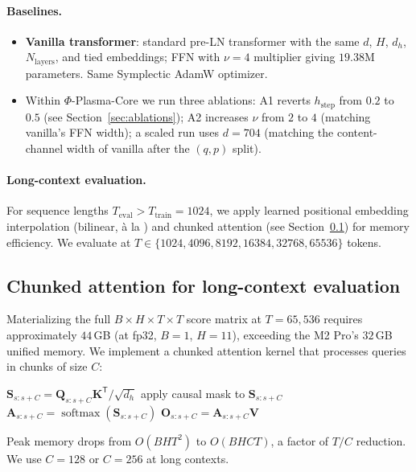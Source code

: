 \documentclass[11pt]{article}
\newcommand{\T}{\mathsf{T}}
\DeclareMathOperator{\softmax}{softmax}
\begin{document}
\paragraph{Baselines.}
\begin{itemize}[leftmargin=*]
\item \textbf{Vanilla transformer}: standard pre-LN transformer with the same
$d$, $H$, $d_h$, $N_{\text{layers}}$, and tied embeddings; FFN with $\nu = 4$
multiplier giving $19.38$M parameters. Same Symplectic AdamW optimizer.
\item Within $\Phi$-Plasma-Core we run three ablations: A1 reverts $h_{\text{step}}$
from $0.2$ to $0.5$ (see Section~\ref{sec:ablations}); A2 increases $\nu$ from
$2$ to $4$ (matching vanilla's FFN width); a scaled run uses $d = 704$
(matching the content-channel width of vanilla after the $(q,p)$ split).
\end{itemize}

\paragraph{Long-context evaluation.}
For sequence lengths $T_{\text{eval}} > T_{\text{train}} = 1024$,
we apply learned positional embedding interpolation
(bilinear, à la \citealp{chen2023extending}) and chunked attention
(see Section~\ref{sec:chunked-attn}) for memory efficiency. We evaluate
at $T \in \{1024, 4096, 8192, 16384, 32768, 65536\}$ tokens.

\subsection{Chunked attention for long-context evaluation}
\label{sec:chunked-attn}

Materializing the full $B \times H \times T \times T$ score matrix at
$T = 65{,}536$ requires approximately $44$\,GB (at fp32, $B = 1$, $H = 11$),
exceeding the M2 Pro's $32$\,GB unified memory. We implement a chunked
attention kernel that processes queries in chunks of size $C$:
\begin{algorithmic}
  \State $\bm{S}_{s:s+C} = \bm{Q}_{s:s+C} \bm{K}^\T / \sqrt{d_h}$
  \State apply causal mask to $\bm{S}_{s:s+C}$
  \State $\bm{A}_{s:s+C} = \softmax(\bm{S}_{s:s+C})$
  \State $\bm{O}_{s:s+C} = \bm{A}_{s:s+C} \bm{V}$
\EndFor
\end{algorithmic}
Peak memory drops from $O(B H T^2)$ to $O(B H C T)$, a factor of $T/C$
reduction. We use $C = 128$ or $C = 256$ at long contexts.
\end{document}
